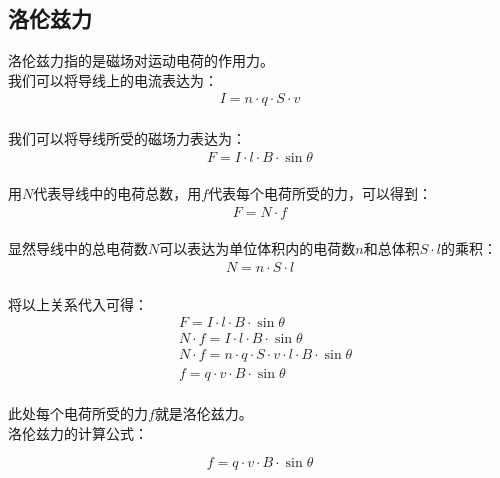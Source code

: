 \documentclass[UTF8]{ctexart}
\begin{document}
\subsection{洛伦兹力}
    洛伦兹力指的是磁场对运动电荷的作用力。\\[4mm]
    我们可以将导线上的电流表达为：
    \setcounter{equation}{0}
    \begin{align}
        I=n\cdot q\cdot S\cdot v
    \end{align}\\
    我们可以将导线所受的磁场力表达为：
    \begin{align}
        F=I\cdot l\cdot B\cdot \sin{\theta}
    \end{align}\\
    用$N$代表导线中的电荷总数，用$f$代表每个电荷所受的力，可以得到：\vspace{5pt}
    \begin{align}
        F=N\cdot f
    \end{align}\\
    显然导线中的总电荷数$N$可以表达为单位体积内的电荷数$n$和总体积$S\cdot l$的乘积：\vspace{5pt}
    \begin{align}
        N=n\cdot S\cdot l
    \end{align}\\
    将以上关系代入可得：
    \begin{align}
        &F=I\cdot l\cdot B\cdot \sin{\theta}\\[3mm]
        &N\cdot f=I\cdot l\cdot B\cdot \sin{\theta}\\[3mm]
        &N\cdot f=n\cdot q\cdot S\cdot v\cdot l\cdot B\cdot \sin{\theta}\\[3mm]
        &f=q\cdot v\cdot B\cdot \sin{\theta}
    \end{align}\\
    此处每个电荷所受的力$f$就是洛伦兹力。\\[4mm]
    洛伦兹力的计算公式：
    \begin{large}
        \begin{equation*}
            f=q\cdot v\cdot B\cdot\sin{\theta}
        \end{equation*}
    \end{large}

\newpage
\end{document}

